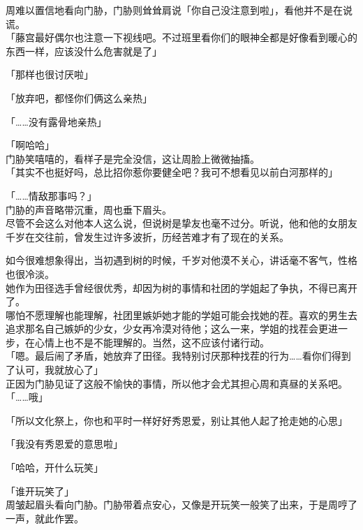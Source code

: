 周难以置信地看向门胁，门胁则耸耸肩说「你自己没注意到啦」，看他并不是在说谎。\\

「藤宫最好偶尔也注意一下视线吧。不过班里看你们的眼神全都是好像看到暖心的东西一样，应该没什么危害就是了」

「那样也很讨厌啦」

「放弃吧，都怪你们俩这么亲热」

「……没有露骨地亲热」

「啊哈哈」\\

门胁笑嘻嘻的，看样子是完全没信，这让周脸上微微抽搐。\\

「其实不也挺好吗，总比招你惹你要健全吧？我可不想看见以前白河那样的」

「……情敌那事吗？」\\

门胁的声音略带沉重，周也垂下眉头。\\

尽管不会这么对他本人这么说，但说树是挚友也毫不过分。听说，他和他的女朋友千岁在交往前，曾发生过许多波折，历经苦难才有了现在的关系。

如今很难想象得出，当初遇到树的时候，千岁对他漠不关心，讲话毫不客气，性格也很冷淡。\\

她作为田径选手曾经很优秀，却因为树的事情和社团的学姐起了争执，不得已离开了。\\

哪怕不愿理解也能理解，社团里嫉妒她才能的学姐可能会找她的茬。喜欢的男生去追求那名自己嫉妒的少女，少女再冷漠对待他；这么一来，学姐的找茬会更进一步，在心情上也不是不能理解的。当然，这不应该付诸行动。\\

「嗯。最后闹了矛盾，她放弃了田径。我特别讨厌那种找茬的行为……看你们得到了认可，我就放心了」\\

正因为门胁见证了这般不愉快的事情，所以他才会尤其担心周和真昼的关系吧。\\

「……哦」

「所以文化祭上，你也和平时一样好好秀恩爱，别让其他人起了抢走她的心思」

「我没有秀恩爱的意思啦」

「哈哈，开什么玩笑」

「谁开玩笑了」\\

周皱起眉头看向门胁。门胁带着点安心，又像是开玩笑一般笑了出来，于是周哼了一声，就此作罢。
